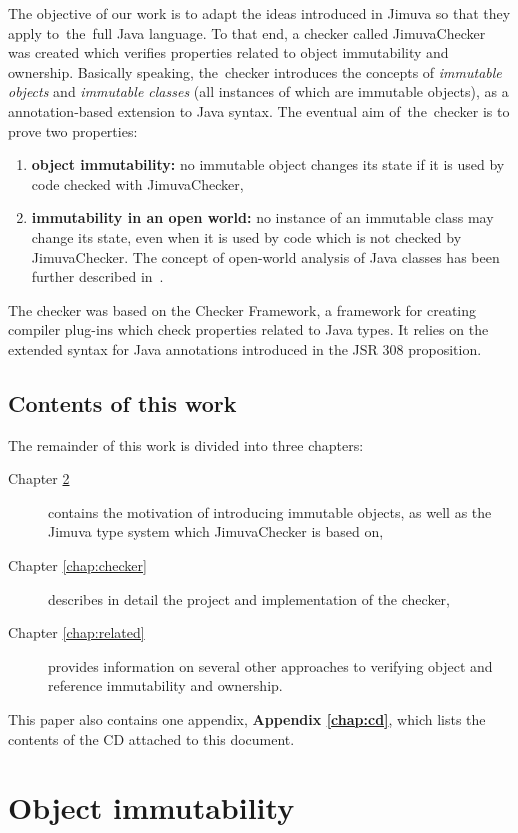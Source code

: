 \documentclass{pracamgr}
\theoremstyle{break}
\theoremstyle{break}
\theoremstyle{break}
\begin{document}
The objective of our work is to adapt the ideas introduced in Jimuva
so that they apply to~the~full Java language. To that end, a checker
called JimuvaChecker was created which ve\-ri\-fies properties related
to object immutability and ownership. Basically speaking, the~checker
introduces the concepts of \emph{immutable objects} and
\emph{immutable classes} (all instances of which are immutable
objects), as a annotation-based extension to Java syntax. The eventual
aim of~the~checker is to prove two properties:
\begin{enumerate}
\item \textbf{object immutability:} no immutable object changes its
  state if it is used by code checked with JimuvaChecker,
\item \textbf{immutability in an open world:} no instance of an
  immutable class may change its state, even when it is used by code
  which is not checked by JimuvaChecker. The concept of open-world
  analysis of Java classes has been further described
  in~\cite{openworld}.
\end{enumerate}
The checker was based on the Checker Framework, a framework for
creating compiler plug-ins which check properties related to Java
types. It relies on the extended syntax for Java annotations
introduced in the JSR 308 proposition.

\section{Contents of this work}

The remainder of this work is divided into three chapters:
\begin{description}
\item[Chapter \ref{chap:imm}] contains the motivation of introducing
  immutable objects, as well as the Jimuva type system which
  JimuvaChecker is based on,
\item[Chapter \ref{chap:checker}] describes in detail the project and
  implementation of the checker,
\item[Chapter \ref{chap:related}] provides information on several
  other approaches to verifying object and reference immutability and
  ownership.
\end{description}
This paper also contains one appendix, \textbf{Appendix
  \ref{chap:cd}}, which lists the contents of the CD attached to this
document.

\chapter{Object immutability}
\label{chap:imm}
\end{document}
